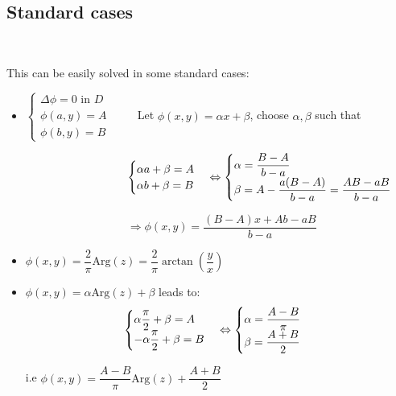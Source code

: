 \subsection{Standard cases}\hfill\\\par
\noindent This can be easily solved in some standard cases:
\par\bigskip
\begin{itemize}
  \item$\begin{cases}\Delta\phi=0\text{ in $D$}\\\phi(a,y) = A\\\phi(b,y)=B\end{cases}\qquad$ Let $\phi(x,y) = \alpha x+\beta$, choose $\alpha,\beta$ such that\par$\quad\qquad\qquad\qquad\qquad\begin{cases}\alpha a+\beta = A\\\alpha b+\beta = B\end{cases}\Leftrightarrow\begin{cases}\alpha = \dfrac{B-A}{b-a}\\\beta = A-\dfrac{a(B-A)}{b-a}=\dfrac{AB-aB}{b-a}\end{cases}$\par\bigskip
    $\quad\qquad\qquad\qquad\qquad\Rightarrow\phi(x,y) = \dfrac{(B-A)x+Ab-aB}{b-a}$
    \par\bigskip
  \item $\phi(x,y) = \dfrac{2}{\pi}\text{Arg}(z) = \dfrac{2}{\pi}\arctan\left(\dfrac{y}{x}\right)$
    \par\bigskip
  \item $\phi(x,y) = \alpha\text{Arg}(z)+\beta$ leads to:
    \begin{equation*}
      \begin{gathered}
        \begin{cases}
          \alpha\dfrac{\pi}{2}+\beta = A\\
          -\alpha\dfrac{\pi}{2}+\beta = B
          \end{cases}\Leftrightarrow\begin{cases}
        \alpha = \dfrac{A-B}{\pi}\\\beta = \dfrac{A+B}{2}\end{cases}
      \end{gathered}
    \end{equation*}\par
    i.e $\phi(x,y) = \dfrac{A-B}{\pi}\text{Arg}(z)+\dfrac{A+B}{2}$
    \par\bigskip

\end{itemize}
